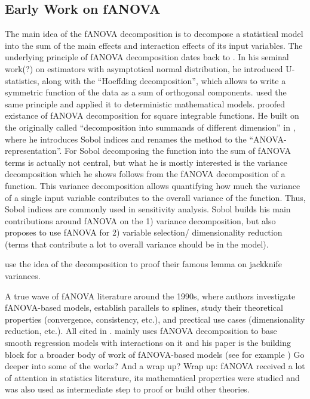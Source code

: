
\subsection{Early Work on fANOVA}
The main idea of the fANOVA decomposition is to decompose a statistical model into the sum of the main effects and interaction effects of its input variables. The underlying principle of fANOVA decomposition dates back to \cite{hoeffding1948}. In his seminal work(?) on estimators with asymptotical normal distribution, he introduced U-statistics, along with the ``Hoeffding decomposition'', which allows to write a symmetric function of the data as a sum of orthogonal components.
\cite{sobol1993sensitivity} used the same principle and applied it to deterministic mathematical models. proofed existance of fANOVA decomposition for square integrable functions.
He built on the originally called ``decomposition into summands of different dimension'' in \cite{sobol2001}, where he introduces Sobol indices and renames the method to the ``ANOVA-representation''. For Sobol decomposing the function into the sum of fANOVA terms is actually not central, but what he is mostly interested is the variance decomposition which he shows follows from the fANOVA decomposition of a function.
This variance decomposition allows quantifying how much the variance of a single input variable contributes to the overall variance of the function. Thus, Sobol indices are commonly used in sensitivity analysis.
Sobol builds his main contributions around fANOVA on the 1) variance decomposition, but also proposes to use fANOVA for 2) variable selection/ dimensionality reduction (terms that contribute a lot to overall variance should be in the model).\par

\cite{efron1981} use the idea of the decomposition to proof their famous lemma on jackknife variances.

A true wave of fANOVA literature around the 1990s, where authors investigate fANOVA-based models, establish parallels to splines, study their theoretical properties (convergence, consistency, etc.), and prectical use cases (dimensionality reduction, etc.). All cited in \cite{huang1998a}.
\cite{stone1994} mainly uses fANOVA  decomposition to base smooth regression models with interactions on it and his paper is the building block for a broader body of work of fANOVA-based models (see for example \cite{Huang1996, huang1998a})
Go deeper into some of the works? And a wrap up? Wrap up: fANOVA received a lot of attention in statistics literature, its mathematical properties were studied and was also used as intermediate step to proof or build other theories.

